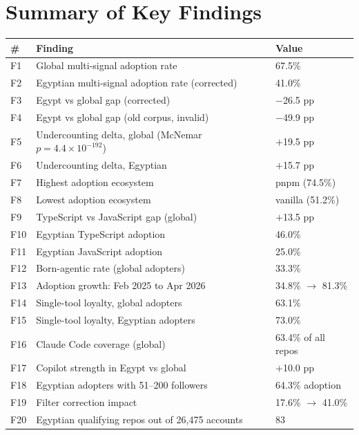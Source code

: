 \documentclass[12pt,a4paper]{article}
\begin{document}
\section{Summary of Key Findings}

\begin{table}[h]
\centering
\begin{tabular}{@{}lll@{}}
\toprule
\# & Finding & Value \\
\midrule
F1  & Global multi-signal adoption rate               & 67.5\% \\
F2  & Egyptian multi-signal adoption rate (corrected) & 41.0\% \\
F3  & Egypt vs global gap (corrected)                 & $-$26.5 pp \\
F4  & Egypt vs global gap (old corpus, invalid)       & $-$49.9 pp \\
F5  & Undercounting delta, global (McNemar $p = 4.4\times10^{-192}$) & $+$19.5 pp \\
F6  & Undercounting delta, Egyptian                   & $+$15.7 pp \\
F7  & Highest adoption ecosystem                      & pnpm (74.5\%) \\
F8  & Lowest adoption ecosystem                       & vanilla (51.2\%) \\
F9  & TypeScript vs JavaScript gap (global)           & $+$13.5 pp \\
F10 & Egyptian TypeScript adoption                    & 46.0\% \\
F11 & Egyptian JavaScript adoption                    & 25.0\% \\
F12 & Born-agentic rate (global adopters)             & 33.3\% \\
F13 & Adoption growth: Feb 2025 to Apr 2026           & 34.8\% $\to$ 81.3\% \\
F14 & Single-tool loyalty, global adopters            & 63.1\% \\
F15 & Single-tool loyalty, Egyptian adopters          & 73.0\% \\
F16 & Claude Code coverage (global)                   & 63.4\% of all repos \\
F17 & Copilot strength in Egypt vs global             & $+$10.0 pp \\
F18 & Egyptian adopters with 51--200 followers        & 64.3\% adoption \\
F19 & Filter correction impact                        & 17.6\% $\to$ 41.0\% \\
F20 & Egyptian qualifying repos out of 26,475 accounts & 83 \\
\bottomrule
\end{tabular}
\end{table}
\end{document}
